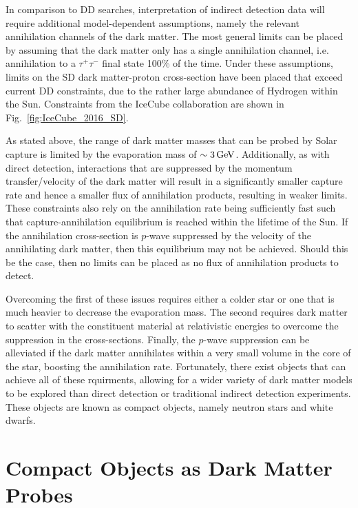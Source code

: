 In comparison to DD searches, interpretation of indirect detection data will require additional model-dependent assumptions, namely the relevant annihilation channels of the dark matter. 
The most general limits can be placed by assuming that the dark matter only has a single annihilation channel, i.e. annihilation to a $\tau^+\tau^-$ final state 100\% of the time. 
Under these assumptions, limits on the SD dark matter-proton cross-section have been placed that exceed current DD constraints, due to the rather large abundance of Hydrogen within the Sun. Constraints from the IceCube collaboration are shown in Fig.~\ref{fig:IceCube_2016_SD}.

As stated above, the range of dark matter masses that can be probed by Solar capture is limited by the evaporation mass of $\sim 3{\rm \,GeV}$. Additionally, as with direct detection, interactions that are suppressed by the momentum transfer/velocity of the dark matter will result in a significantly smaller capture rate and hence a smaller flux of annihilation products, resulting in weaker limits. These constraints also rely on the annihilation rate being sufficiently fast such that capture-annihilation equilibrium is reached within the lifetime of the Sun. If the annihilation cross-section is $p$-wave suppressed by the velocity of the annihilating dark matter, then this equilibrium may not be achieved. Should this be the case, then no limits can be placed as no flux of annihilation products to detect. 

Overcoming the first of these issues requires either a colder star or one that is much heavier to decrease the evaporation mass. The second requires dark matter to scatter with the constituent material at relativistic energies to overcome the suppression in the cross-sections. Finally, the $p$-wave suppression can be alleviated if the dark matter annihilates within a very small volume in the core of the star, boosting the annihilation rate.
Fortunately, there exist objects that can achieve all of these rquirments, allowing for a wider variety of dark matter models to be explored than direct detection or traditional indirect detection experiments. These objects are known as compact objects, namely neutron stars and white dwarfs.

\section{Compact Objects as Dark Matter Probes}


